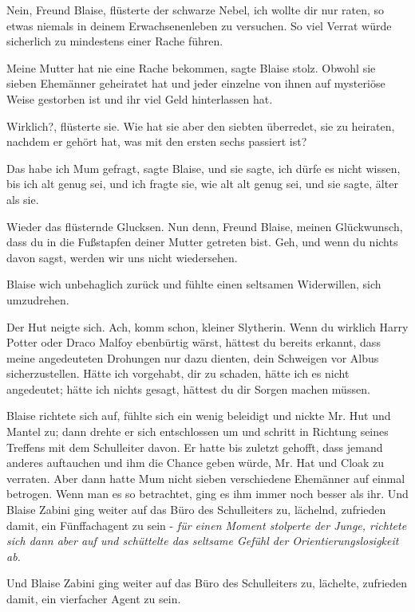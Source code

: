 \glqq{}Nein, Freund Blaise\grqq{}, flüsterte der schwarze Nebel, \glqq{}ich wollte
dir nur raten, so etwas niemals in deinem Erwachsenenleben zu versuchen. So viel
Verrat würde sicherlich zu mindestens einer Rache führen.\grqq{}

\glqq{}Meine Mutter hat nie eine Rache bekommen\grqq{}, sagte Blaise stolz. \glqq{}
Obwohl sie sieben Ehemänner geheiratet hat und jeder einzelne von ihnen auf
mysteriöse Weise gestorben ist und ihr viel Geld hinterlassen hat.\grqq{}

\glqq{}Wirklich?\grqq{}, flüsterte sie. \glqq{}Wie hat sie aber den siebten
überredet, sie zu heiraten, nachdem er gehört hat, was mit den ersten sechs
passiert ist?\grqq{}

\glqq{}Das habe ich Mum gefragt\grqq{}, sagte Blaise, \glqq{}und sie sagte, ich
dürfe es nicht wissen, bis ich alt genug sei, und ich fragte sie, wie alt alt
genug sei, und sie sagte, älter als sie.\grqq{}

Wieder das flüsternde Glucksen. \glqq{}Nun denn, Freund Blaise, meinen
Glückwunsch, dass du in die Fußstapfen deiner Mutter getreten bist. Geh, und
wenn du nichts davon sagst, werden wir uns nicht wiedersehen.\grqq{}

Blaise wich unbehaglich zurück und fühlte einen seltsamen Widerwillen, sich
umzudrehen.

Der Hut neigte sich. \glqq{}Ach, komm schon, kleiner Slytherin. Wenn du wirklich
Harry Potter oder Draco Malfoy ebenbürtig wärst, hättest du bereits erkannt,
dass meine angedeuteten Drohungen nur dazu dienten, dein Schweigen vor Albus
sicherzustellen. Hätte ich vorgehabt, dir zu schaden, hätte ich es nicht
angedeutet; hätte ich nichts gesagt, hättest du dir Sorgen machen müssen.\grqq{}

Blaise richtete sich auf, fühlte sich ein wenig beleidigt und nickte Mr. Hut und
Mantel zu; dann drehte er sich entschlossen um und schritt in Richtung seines
Treffens mit dem Schulleiter davon. Er hatte bis zuletzt gehofft, dass jemand
anderes auftauchen und ihm die Chance geben würde, Mr. Hat und Cloak zu
verraten. Aber dann hatte Mum nicht sieben verschiedene Ehemänner auf einmal
betrogen. Wenn man es so betrachtet, ging es ihm immer noch besser als ihr. Und
Blaise Zabini ging weiter auf das Büro des Schulleiters zu, lächelnd, zufrieden
damit, ein Fünffachagent zu sein -\emph{ für einen Moment stolperte der Junge,
richtete sich dann aber auf und schüttelte das seltsame Gefühl der
Orientierungslosigkeit ab.}

Und Blaise Zabini ging weiter auf das Büro des Schulleiters zu, lächelte,
zufrieden damit, ein vierfacher Agent zu sein.

